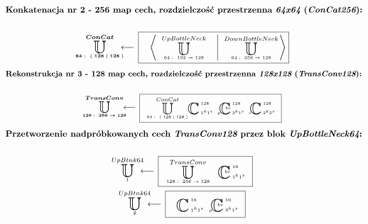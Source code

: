 \begin{equation*}
\begin{gathered}
\textbf{Konkatenacja nr 2 - 256 map cech, rozdzielczość przestrzenna $\textit{64x64}$ ($\textit{ConCat256}$):}
\\~\\
\xunitdef{\boldsymbol{ConCat}}{\boldsymbol{64:\ \langle \; 128 \; | \; 128 \; \rangle}}{\quad
\xaggreg{\quad
\xunit{UpBottleNeck}{64:\ 192\rightarrow128}{}
\quad \left| \quad
\xunit{DownBottleNeck}{64:\ 256\rightarrow128}{}
\right.}}
\end{gathered}
\end{equation*}
\begin{equation*}
\begin{gathered}
\textbf{Rekonstrukcja nr 3 - 128 map cech, rozdzielczość przestrzenna $\textit{128x128}$ ($\textit{TransConv128}$):}
\\~\\
\xunitdef{\boldsymbol{TransConv}}{\boldsymbol{128:\ 256\rightarrow128}}{\quad
\xunit{ConCat}{64:\ \langle \; 128 \; | \; 128 \; \rangle}{}
\xconv{\ 1^k1^s}{\ 128}{}{}{}
\xconv{\ 3^k1^s}{\ 128}{p}{}{br}
\xconv{\ 2^k2^s}{\ 128}{t}{}{}}
\end{gathered}
\end{equation*}
\begin{equation*}
\begin{gathered}
\textbf{Przetworzenie nadpróbkowanych cech $\textit{TransConv128}$ przez blok $\textit{UpBottleNeck64}$:}
\\~\\
\xunitdef{UpBtnk64}{1}{\quad
\xunit{TransConv}{128:\ 256\rightarrow128}{} \quad
\xconv{\ 1^k1^s}{\ 16}{}{}{br}}
\\
\xunitdef{UpBtnk64}{2}{\quad
\xconv{\ 1^k1^s}{\ 16}{}{}{}
\xconv{\ 3^k1^s}{\ 16}{p}{}{br}}
\end{gathered}
\end{equation*}

